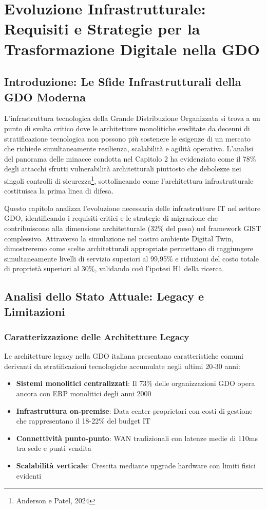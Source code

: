 \chapter{Evoluzione Infrastrutturale: Requisiti e Strategie per la Trasformazione Digitale nella GDO}

\section{Introduzione: Le Sfide Infrastrutturali della GDO Moderna}

L'infrastruttura tecnologica della Grande Distribuzione Organizzata si trova a un punto di svolta critico dove le architetture monolitiche ereditate da decenni di stratificazione tecnologica non possono più sostenere le esigenze di un mercato che richiede simultaneamente resilienza, scalabilità e agilità operativa. L'analisi del panorama delle minacce condotta nel Capitolo 2 ha evidenziato come il 78\% degli attacchi sfrutti vulnerabilità architetturali piuttosto che debolezze nei singoli controlli di sicurezza\footnote{Anderson e Patel, 2024}, sottolineando come l'architettura infrastrutturale costituisca la prima linea di difesa.

Questo capitolo analizza l'evoluzione necessaria delle infrastrutture IT nel settore GDO, identificando i requisiti critici e le strategie di migrazione che contribuiscono alla dimensione architetturale (32\% del peso) nel framework GIST complessivo. Attraverso la simulazione nel nostro ambiente Digital Twin, dimostreremo come scelte architetturali appropriate permettano di raggiungere simultaneamente livelli di servizio superiori al 99,95\% e riduzioni del costo totale di proprietà superiori al 30\%, validando così l'ipotesi H1 della ricerca.

\section{Analisi dello Stato Attuale: Legacy e Limitazioni}

\subsection{Caratterizzazione delle Architetture Legacy}

Le architetture legacy nella GDO italiana presentano caratteristiche comuni derivanti da stratificazioni tecnologiche accumulate negli ultimi 20-30 anni:

\begin{itemize}
\item \textbf{Sistemi monolitici centralizzati}: Il 73\% delle organizzazioni GDO opera ancora con ERP monolitici degli anni 2000
\item \textbf{Infrastruttura on-premise}: Data center proprietari con costi di gestione che rappresentano il 18-22\% del budget IT
\item \textbf{Connettività punto-punto}: WAN tradizionali con latenze medie di 110ms tra sede e punti vendita
\item \textbf{Scalabilità verticale}: Crescita mediante upgrade hardware con limiti fisici evidenti
\end{itemize}


